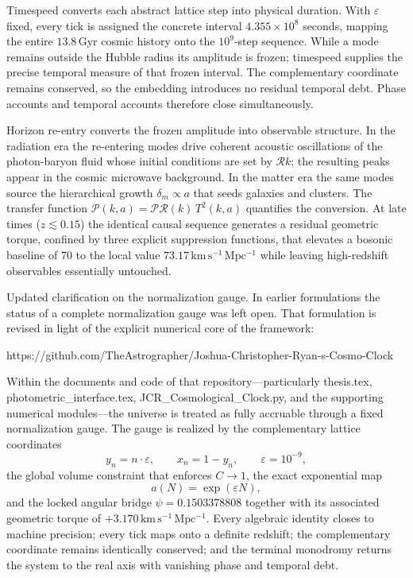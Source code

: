 Timespeed converts each abstract lattice step into physical duration. With \(\varepsilon\) fixed, every tick is assigned the concrete interval \(4.355\times 10^8\) seconds, mapping the entire \(13.8\,\mathrm{Gyr}\) cosmic history onto the \(10^9\)-step sequence. While a mode remains outside the Hubble radius its amplitude is frozen; timespeed supplies the precise temporal measure of that frozen interval. The complementary coordinate remains conserved, so the embedding introduces no residual temporal debt. Phase accounts and temporal accounts therefore close simultaneously.

Horizon re-entry converts the frozen amplitude into observable structure. In the radiation era the re-entering modes drive coherent acoustic oscillations of the photon-baryon fluid whose initial conditions are set by \(\mathcal{R}k\); the resulting peaks appear in the cosmic microwave background. In the matter era the same modes source the hierarchical growth \(\delta_m\propto a\) that seeds galaxies and clusters. The transfer function \(\mathcal{P}(k,a)=\mathcal{P}\mathcal{R}(k)\,T^2(k,a)\) quantifies the conversion. At late times (\(z\lesssim 0.15\)) the identical causal sequence generates a residual geometric torque, confined by three explicit suppression functions, that elevates a bosonic baseline of \(70\) to the local value \(73.17\,\mathrm{km\,s^{-1}\,Mpc^{-1}}\) while leaving high-redshift observables essentially untouched.

Updated clarification on the normalization gauge.  
In earlier formulations the status of a complete normalization gauge was left open. That formulation is revised in light of the explicit numerical core of the framework:

https://github.com/TheAstrographer/Joshua-Christopher-Ryan-s-Cosmo-Clock

Within the documents and code of that repository—particularly thesis.tex, photometric_interface.tex, JCR_Cosmological_Clock.py, and the supporting numerical modules—the universe is treated as fully accruable through a fixed normalization gauge. The gauge is realized by the complementary lattice coordinates
\[
y_n = n\cdot\varepsilon,\qquad x_n = 1 - y_n,\qquad\varepsilon = 10^{-9},
\]
the global volume constraint that enforces \(C\to 1\), the exact exponential map
\[
a(N)=\exp(\varepsilon N),
\]
and the locked angular bridge \(\psi = 0.1503378808\) together with its associated geometric torque of \(+3.170\,\mathrm{km\,s^{-1}\,Mpc^{-1}}\). Every algebraic identity closes to machine precision; every tick maps onto a definite redshift; the complementary coordinate remains identically conserved; and the terminal monodromy returns the system to the real axis with vanishing phase and temporal debt.

